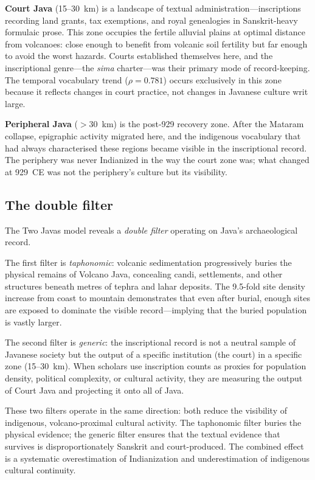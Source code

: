 \documentclass[12pt]{article}
\begin{document}
\textbf{Court Java} (15--30~km) is a landscape of textual administration---inscriptions recording land grants, tax exemptions, and royal genealogies in Sanskrit-heavy formulaic prose.
This zone occupies the fertile alluvial plains at optimal distance from volcanoes: close enough to benefit from volcanic soil fertility but far enough to avoid the worst hazards.
Courts established themselves here, and the inscriptional genre---the \textit{sima} charter---was their primary mode of record-keeping.
The temporal vocabulary trend ($\rho = 0.781$) occurs exclusively in this zone because it reflects changes in court practice, not changes in Javanese culture writ large.

\textbf{Peripheral Java} ($>$30~km) is the post-929 recovery zone.
After the Mataram collapse, epigraphic activity migrated here, and the indigenous vocabulary that had always characterised these regions became visible in the inscriptional record.
The periphery was never Indianized in the way the court zone was; what changed at 929~CE was not the periphery's culture but its visibility.

\subsection{The double filter}

The Two Javas model reveals a \emph{double filter} operating on Java's archaeological record.

The first filter is \emph{taphonomic}: volcanic sedimentation progressively buries the physical remains of Volcano Java, concealing candi, settlements, and other structures beneath metres of tephra and lahar deposits.
The 9.5-fold site density increase from coast to mountain demonstrates that even after burial, enough sites are exposed to dominate the visible record---implying that the buried population is vastly larger.

The second filter is \emph{generic}: the inscriptional record is not a neutral sample of Javanese society but the output of a specific institution (the court) in a specific zone (15--30~km).
When scholars use inscription counts as proxies for population density, political complexity, or cultural activity, they are measuring the output of Court Java and projecting it onto all of Java.

These two filters operate in the same direction: both reduce the visibility of indigenous, volcano-proximal cultural activity.
The taphonomic filter buries the physical evidence; the generic filter ensures that the textual evidence that survives is disproportionately Sanskrit and court-produced.
The combined effect is a systematic overestimation of Indianization and underestimation of indigenous cultural continuity.
\end{document}
